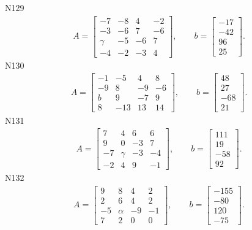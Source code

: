 \documentclass[11pt]{report}
\begin{document}
N129
\begin{align*}
 A = \left[\begin{matrix}-7 & -8 & 4 & -2\\-3 & -6 & 7 & -6\\\gamma & -5 & -6 & 7\\-4 & -2 & -3 & 4\end{matrix}\right],
\qquad b = \left[\begin{matrix}-17\\-42\\96\\25\end{matrix}\right]. 
 \end{align*}
N130
\begin{align*}
 A = \left[\begin{matrix}-1 & -5 & 4 & 8\\-9 & 8 & -9 & -6\\b & 9 & -7 & 9\\8 & -13 & 13 & 14\end{matrix}\right],
\qquad b = \left[\begin{matrix}48\\27\\-68\\21\end{matrix}\right]. 
 \end{align*}
N131
\begin{align*}
 A = \left[\begin{matrix}7 & 4 & 6 & 6\\9 & 0 & -3 & 7\\-7 & \gamma & -3 & -4\\-2 & 4 & 9 & -1\end{matrix}\right],
\qquad b = \left[\begin{matrix}111\\19\\-58\\92\end{matrix}\right]. 
 \end{align*}
N132
\begin{align*}
 A = \left[\begin{matrix}9 & 8 & 4 & 2\\2 & 6 & 4 & 2\\-5 & \alpha & -9 & -1\\7 & 2 & 0 & 0\end{matrix}\right],
\qquad b = \left[\begin{matrix}-155\\-80\\120\\-75\end{matrix}\right]. 
 \end{align*}
\end{document}
